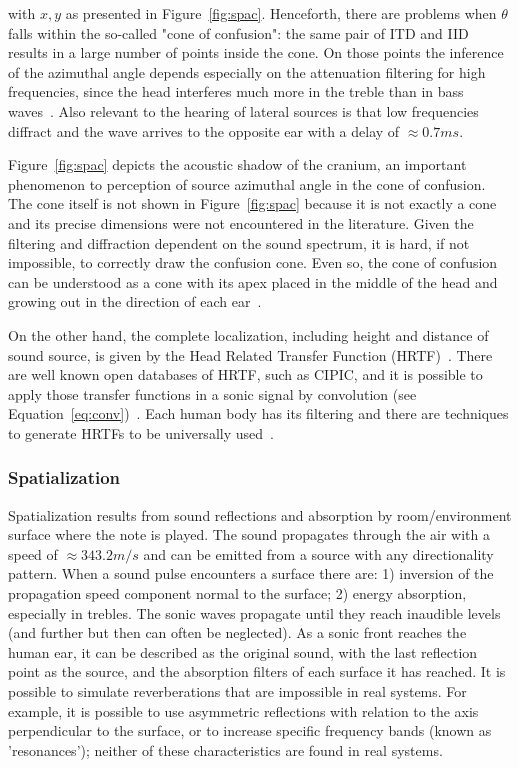 \noindent with $x,y$ as presented in Figure~\ref{fig:spac}. Henceforth, there are problems when $\theta$ falls within the so-called "cone of confusion": the same pair of ITD and IID results in a large number of points inside the cone. On those points the inference of the azimuthal angle depends especially on the attenuation filtering for high frequencies, since the head interferes much more in the treble than in bass waves~\cite{Heeger,hrtf}. Also relevant to the hearing of lateral sources is that low frequencies diffract and the wave arrives to the opposite ear with a delay of $\approx 0.7ms$.\cite{floEsp}

Figure~\ref{fig:spac} depicts the acoustic shadow of the cranium, an important phenomenon to perception of source azimuthal angle in the cone of confusion. The cone itself is not shown in Figure~\ref{fig:spac} because it is not exactly a cone and its precise dimensions were not encountered in the literature. Given the filtering and diffraction dependent on the sound spectrum, it is hard, if not impossible, to correctly draw the confusion cone. Even so, the cone of confusion can be understood as a cone with its apex placed in the middle of the head and growing out in the direction of each ear~\cite{hrtf}.

On the other hand, the complete localization, including height and distance of sound source, is given by the Head Related Transfer Function (HRTF)~\cite{hrtf}. There are well known open databases of HRTF, such as CIPIC, and it is possible to apply those transfer functions in a sonic signal by convolution (see Equation~\ref{eq:conv})~\cite{CIPIC}. Each human body has its filtering and there are techniques to generate HRTFs to be universally used~\cite{lazaSPA}. 

\subsubsection{Spatialization}
Spatialization results from sound reflections and absorption by room/environment surface where the note is played. The sound propagates through the air with a speed of $\approx 343.2m/s$ and can be emitted from a source with any directionality pattern. When a sound pulse encounters a surface there are: 1) inversion of the propagation speed component normal to the surface;  2) energy absorption, especially in trebles. The sonic waves propagate until they reach inaudible levels (and further but then can often be neglected). As a sonic front reaches the human ear, it can be described as the original sound, with the last reflection point as the source, and the absorption filters of each surface it has reached. It is possible to simulate reverberations that are impossible in real systems. For example, it is possible to use asymmetric reflections with relation to the axis perpendicular to the surface, or to increase specific frequency bands (known as 'resonances'); neither of these characteristics are found in real systems.

